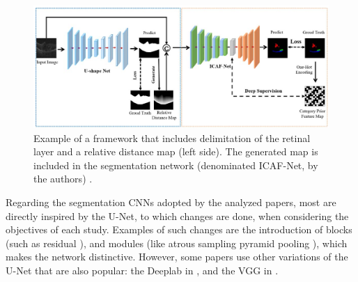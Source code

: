 \begin{figure}[!ht]
	\centering
	\includegraphics[width=1\linewidth]{figures/PreSegmentationAndFluidSegmentation.png}
	\caption{Example of a framework that includes delimitation of the retinal layer and a relative distance map (left side). The generated map is included in the segmentation network (denominated ICAF-Net, by the authors) \parencite{Tang2022}.}
	\label{fig:PreSegmentationAndFluidSegmentation}
\end{figure}
\par
Regarding the segmentation CNNs adopted by the analyzed papers, most are directly inspired by the U-Net, to which changes are done, when considering the objectives of each study. Examples of such changes are the introduction of blocks (such as residual \parencite{Mantel2021, Zhang2023, Liu2024, Hassan2021b, Hassan2021a, Padilla2022}), and modules (like atrous sampling pyramid pooling \parencite{Hassan2021b, Hassan2021a, Hu2019, Sappa2021}), which makes the network distinctive. However, some papers use other variations of the U-Net that are also popular: the Deeplab \parencite{LChen2018} in \textcite{Hassan2021a, Li2023}, and the VGG \parencite{Simonyan2014} in \textcite{Padilla2022, Hassan2021b}.

